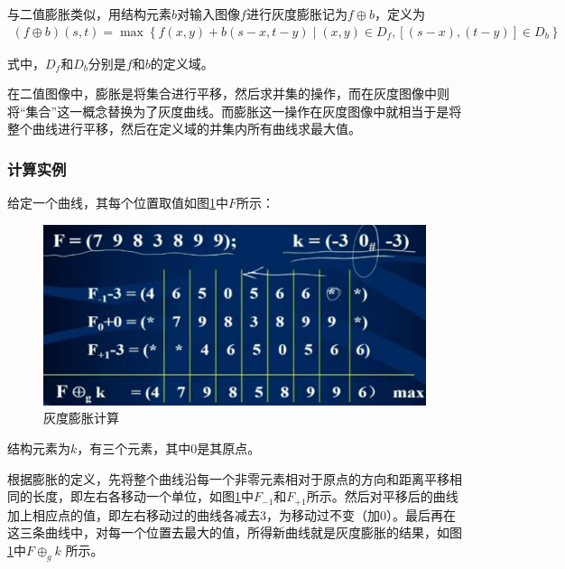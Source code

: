 \documentclass[UTF8]{ctexart}
\begin{document}
            \indent 与二值膨胀类似，用结构元素$b$对输入图像$f$进行灰度膨胀记为$f \oplus b$，定义为
                        \begin{align}
                            \left( f \oplus b \right)\left( s, t \right) = \max \left\{ f\left( x, y \right) + b\left( s-x, t-y \right)  \mid \left( x, y \right) \in D_f, \left[ \left( s-x \right), \left( t-y \right) \right] \in D_b \right\} 
                        \end{align}       
             
             式中，$D_f$和$D_b$分别是$f$和$b$的定义域。  
             
             \indent 在二值图像中，膨胀是将集合进行平移，然后求并集的操作，而在灰度图像中则将“集合”这一概念替换为了灰度曲线。而膨胀这一操作在灰度图像中就相当于是将整个曲线进行平移，然后在定义域的并集内所有曲线求最大值。   
             
             \subsubsection{计算实例}
             
                \indent 给定一个曲线，其每个位置取值如图\ref{grey_dilation_calculate}中$F$所示：

                			\begin{figure}[H]
                				\centering 
                				\includegraphics[scale=0.4]{grey_dilation_calculate.png} 
                				\caption{灰度膨胀计算} 
                				\label{grey_dilation_calculate}
                			\end{figure}                 
                            
                \indent 结构元素为$k$，有三个元素，其中$0$是其原点。
                
                \indent 根据膨胀的定义，先将整个曲线沿每一个非零元素相对于原点的方向和距离平移相同的长度，即左右各移动一个单位，如图\ref{grey_dilation_calculate}中$F_{-1}$和$F_{+1}$所示。然后对平移后的曲线加上相应点的值，即左右移动过的曲线各减去$3$，为移动过不变（加$0$）。最后再在这三条曲线中，对每一个位置去最大的值，所得新曲线就是灰度膨胀的结果，如图\ref{grey_dilation_calculate}中$F \oplus _g k$ 所示。
                
\end{document}
